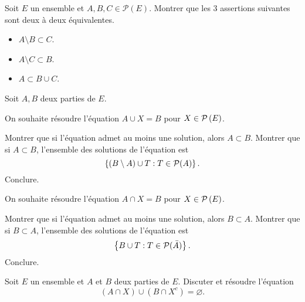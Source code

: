 \documentclass{magnolia}
\begin{document}
Soit $E$ un ensemble et $A,B,C\in\mathcal{P}(E)$. Montrer que les 3 assertions suivantes
sont deux à deux équivalentes.
\begin{itemize}
\item $A\setminus B\subset C$.
\item $A\setminus C\subset B$. 
\item $A\subset B\cup C$.
\end{itemize}


Soit $A,B$ deux parties de $E$.
\begin{questions}
\question On souhaite résoudre l'équation $A\cup X=B$ pour $X\in\mathcal{P}\left(E\right)$.
  \begin{questions}
  \question Montrer que si l'équation admet au moins une solution, alors $A\subset B$.
  \question Montrer que si $A\subset B$, l'ensemble des solutions de l'équation est
    \[\left\{(B\setminus A)\cup T : T\in\mathcal{P}(A)\right\}.\]
  \question Conclure.
  \end{questions}
\question On souhaite résoudre l'équation $A\cap X=B$ pour $X\in\mathcal{P}\left(E\right)$.
  \begin{questions}
  \question Montrer que si l'équation admet au moins une solution, alors $B\subset A$.
  \question Montrer que si $B\subset A$, l'ensemble des solutions de l'équation est
    \[\left\{B\cup T : T\in\mathcal{P}(\bar{A})\right\}.\]
  \question Conclure.
  \end{questions}
\end{questions}


Soit $E$ un ensemble et $A$ et $B$ deux parties de $E$. Discuter et résoudre
l'équation
\[(A\cap X)\cup(B\cap X^c)=\varnothing.\]

\end{document}
